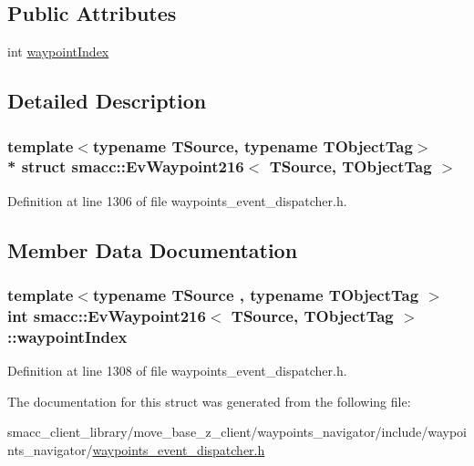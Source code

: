 \subsection*{Public Attributes}
\begin{DoxyCompactItemize}
\item 
int \hyperlink{structsmacc_1_1EvWaypoint216_ac383a24d82b7aad2a2cbd62b04990e41}{waypoint\+Index}
\end{DoxyCompactItemize}


\subsection{Detailed Description}
\subsubsection*{template$<$typename T\+Source, typename T\+Object\+Tag$>$\\*
struct smacc\+::\+Ev\+Waypoint216$<$ T\+Source, T\+Object\+Tag $>$}



Definition at line 1306 of file waypoints\+\_\+event\+\_\+dispatcher.\+h.



\subsection{Member Data Documentation}
\subsubsection[{\texorpdfstring{waypoint\+Index}{waypointIndex}}]{\setlength{\rightskip}{0pt plus 5cm}template$<$typename T\+Source , typename T\+Object\+Tag $>$ int {\bf smacc\+::\+Ev\+Waypoint216}$<$ T\+Source, T\+Object\+Tag $>$\+::waypoint\+Index}\hypertarget{structsmacc_1_1EvWaypoint216_ac383a24d82b7aad2a2cbd62b04990e41}{}\label{structsmacc_1_1EvWaypoint216_ac383a24d82b7aad2a2cbd62b04990e41}


Definition at line 1308 of file waypoints\+\_\+event\+\_\+dispatcher.\+h.



The documentation for this struct was generated from the following file\+:\begin{DoxyCompactItemize}
\item 
smacc\+\_\+client\+\_\+library/move\+\_\+base\+\_\+z\+\_\+client/waypoints\+\_\+navigator/include/waypoints\+\_\+navigator/\hyperlink{waypoints__event__dispatcher_8h}{waypoints\+\_\+event\+\_\+dispatcher.\+h}\end{DoxyCompactItemize}
